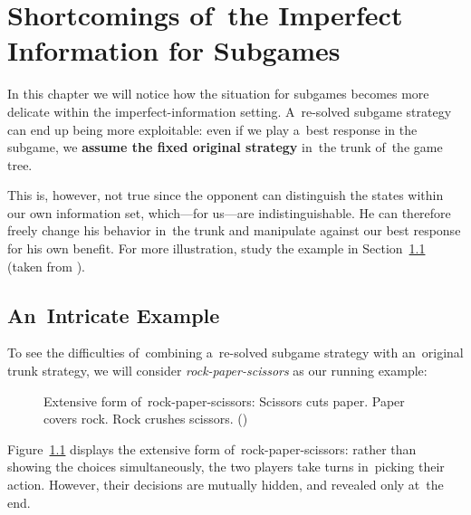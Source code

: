 \chapter{Shortcomings of~the Imperfect Information for Subgames}
\label{ch:imperf-shortcomings}
In this chapter we will notice how the situation for subgames becomes more delicate within the imperfect-information setting.
A~re-solved subgame strategy can end up being more exploitable:
even if we play a~best response in the subgame, we \textbf{assume the fixed original strategy} in~the trunk of~the game tree.

This is, however, not true since the opponent can distinguish the states within our own information set, which---for us---are indistinguishable.
He can therefore freely change his behavior in~the trunk and manipulate against our best response for his own benefit.
For more illustration, study the example in Section~\ref{sec:intricate-ex} (taken from \cite{BurchJohansonBowling13}).

\section{An~Intricate Example}
\label{sec:intricate-ex}
To see the difficulties of~combining a~re-solved subgame strategy with an~original trunk strategy, we will consider \emph{rock-paper-scissors}\footnotemark{} as our running example:
\begin{figure}[H]
  \centering
  \scriptsize
  \def\svgwidth{.45\textwidth}
  
  \def\captionTitle{Extensive form of~rock-paper-scissors}
  \caption[\captionTitle]{\captionTitle: Scissors cuts paper. Paper covers rock. Rock crushes scissors. (\cite{Ganzfried2015endgame, BurchJohansonBowling13})}
  \label{fig:game-tree-rock-paper-scissors}
\end{figure}

Figure~\ref{fig:game-tree-rock-paper-scissors} displays the extensive form of~rock-paper-scissors:
rather than showing the choices simultaneously, the two players take turns in~picking their action.
However, their decisions are mutually hidden, and revealed only at~the end.

